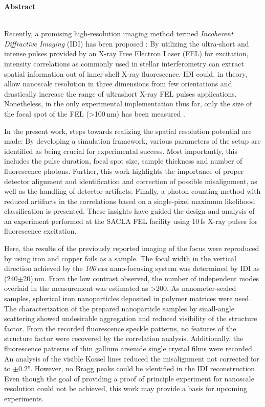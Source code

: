 	\begin{Huge}
		\textbf{Abstract}\vspace{12mm}
	\end{Huge}
\\
Recently, a promising high-resolution imaging method termed \textit{Incoherent Diffractive Imaging} (IDI) has been proposed \cite{classen2017}: By utilizing the ultra-short and intense pulses provided by an X-ray Free Electron Laser (FEL) for excitation,  intensity correlations as commonly used in stellar interferometry can extract spatial information out of inner shell X-ray fluorescence.  
IDI could, in theory, allow nanoscale resolution in three dimensions from few orientations and drastically increase the range of ultrashort X-ray FEL pulses applications. Nonetheless, in the only experimental implementation thus far, only the size of the focal spot of the FEL (>100\,nm) has been measured \cite{nakumura2020}.

In the present work, steps towards realizing the spatial resolution potential are made: By developing a simulation framework, various parameters of the setup are identified as being crucial for experimental success. Most importantly, this includes the pulse duration, focal spot size,  sample thickness and number of fluorescence photons. Further, this work highlights the importance of proper detector alignment and identification and correction of possible misalignment, as well as the handling of detector artifacts. Finally, a photon-counting method with reduced artifacts in the correlations based on a single-pixel maximum likelihood classification is presented. These insights have guided the design and analysis of an experiment performed at the SACLA FEL facility using 10\,fs X-ray pulses for fluorescence excitation.

Here, the results of the previously reported imaging of the focus were reproduced by using iron and copper foils as a sample. The focal width in the vertical direction achieved by the \textit{100\,exa} nano-focusing system was determined by IDI  as (240$\pm$20)\,nm. From the low contrast observed, the number of independent modes overlaid in the measurement was estimated as >200.  As nanometer-scaled samples, spherical iron nanoparticles deposited in polymer matrices were used. The characterization of the prepared nanoparticle samples by small-angle scattering showed undesirable aggregation and reduced visibility of the structure factor.  From the recorded fluorescence speckle patterns, no features of the structure factor were recovered by the correlation analysis.  Additionally, the fluorescence patterns of thin gallium arsenide single crystal films were recorded.  An analysis of the visible Kossel lines reduced the misalignment not corrected for to $\pm$0.2°. However, no Bragg peaks could be identified in the IDI reconstruction.
Even though the goal of providing a proof of principle experiment for nanoscale resolution could not be achieved, this work may provide a basis for upcoming experiments.





